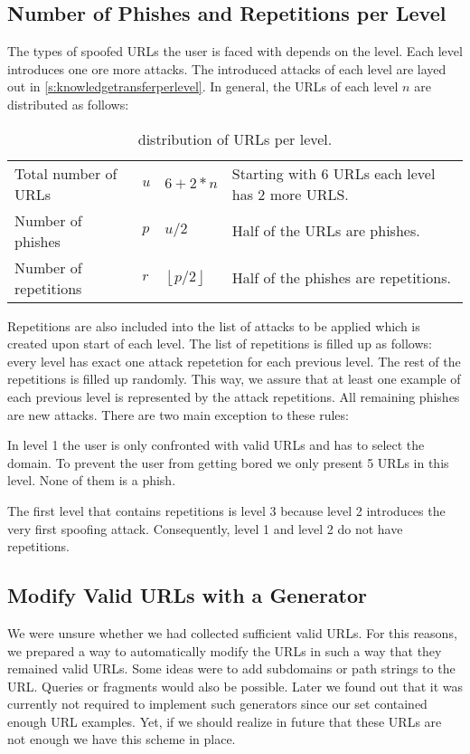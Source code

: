 \subsection{Number of Phishes and Repetitions per Level}
The types of spoofed URLs the user is faced with depends on the level.
Each level introduces one ore more attacks.
The introduced attacks of each level are layed out in \autoref{s:knowledgetransferperlevel}.
In general, the URLs of each level $n$ are distributed as follows:
\begin{table}[hHtbp]
\centering
\begin{tabular}{|llll|}
\hline
Total number of URLs&$u$&$6+2*n$&Starting with 6 URLs each level has 2 more URLS.\\
Number of phishes&$p$&$u/2$&Half of the URLs are phishes.\\
Number of repetitions&$r$&$\left\lfloor p/2 \right\rfloor$&Half of the phishes are repetitions.\\
\hline
\end{tabular}
\caption{distribution of URLs per level.}
\label{t:levelurls}
\end{table}
Repetitions are also included into the list of attacks to be applied which is created upon start of each level.
The list of repetitions is filled up as follows: every level has exact one attack repetetion for each previous level. The rest of the repetitions is filled up randomly. This way, we assure that at least one example of each previous level is represented by the attack repetitions. All remaining phishes are new attacks.
There are two main exception to these rules:
\begin{description}[leftmargin=0cm]
\item[Level 1:] In level 1 the user is only confronted with valid URLs and has to select the domain.
To prevent the user from getting bored we only present 5 URLs in this level.
None of them is a phish.
\item[Level 1+2:] The first level that contains repetitions is level 3 because level 2 introduces the very first spoofing attack. Consequently, level 1 and level 2 do not have repetitions.
\end{description}


\subsection{Modify Valid URLs with a Generator}
\label{s:apply_generator}
We were unsure whether we had collected sufficient valid URLs.
 For this reasons, we prepared a way to automatically modify the URLs in such a way that they remained valid URLs. 
Some ideas were to add subdomains or path strings to the URL. Queries or fragments would also  be possible. 
Later we found out that it was currently not required to implement such generators since our set contained enough URL examples. 
Yet, if we should realize in future that these URLs are not enough we have this scheme in place.
